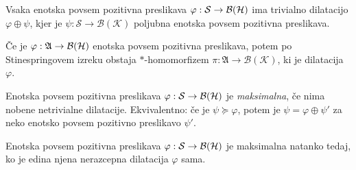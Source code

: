 \begin{zgled}
    Vsaka enotska povsem pozitivna preslikava $\varphi: \mathcal{S} \to \operatorname{\mathcal{B} (\mathcal{H})}$ ima trivialno dilatacijo $\varphi \oplus \psi$,
    kjer je $\psi: \mathcal{S} \to \mathcal{B}(\mathcal{K})$ poljubna enotska povsem pozitivna preslikava.
\end{zgled}

\begin{zgled}
    Če je $\varphi: \mathfrak{A}  \to \operatorname{\mathcal{B} (\mathcal{H})}$ enotska povsem pozitivna preslikava, 
    potem po Stinespringovem izreku obstaja $*$-homomorfizem $\pi: \mathfrak{A} \to \mathcal{B}(\mathcal{K})$,
    ki je dilatacija $\varphi$.
\end{zgled}

\begin{definicija}
    Enotska povsem pozitivna preslikava $\varphi: \mathcal{S} \to \operatorname{\mathcal{B} (\mathcal{H})}$ je \emph{maksimalna},
    če nima nobene netrivialne dilatacije. Ekvivalentno: če je $\psi \succeq \varphi$,
    potem je $\psi = \varphi \oplus \psi'$ za neko enotsko povsem pozitivno preslikavo $\psi'$.
\end{definicija}

\begin{lema}
    Enotska povsem pozitivna preslikava $\varphi: \mathcal{S} \to \operatorname{\mathcal{B} (\mathcal{H})}$ je maksimalna natanko tedaj, ko je edina njena nerazcepna dilatacija
    $\varphi$ sama.
\end{lema}

